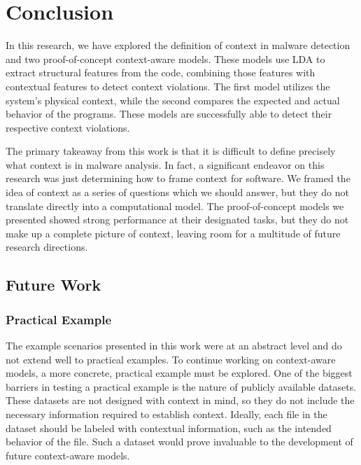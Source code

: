 \documentclass[../stegner_thesis.tex]{subfiles}
\begin{document}
\chapter{Conclusion}%
\label{ch:conclusion}

\par In this research, we have explored the definition of context in malware
detection and two proof-of-concept context-aware models.
These models use LDA to extract structural features from the code, combining
those features with contextual features to detect context violations.
The first model utilizes the system's physical context, while the second
compares the expected and actual behavior of the programs.
These models are successfully able to detect their respective context
violations.

\par The primary takeaway from this work is that it is difficult to define
precisely what context is in malware analysis.
In fact, a significant endeavor on this research was just determining how to
frame context for software.
We framed the idea of context as a series of questions which we should answer,
but they do not translate directly into a computational model.
The proof-of-concept models we presented showed strong performance at their
designated tasks, but they do not make up a complete picture of context,
leaving room for a multitude of future research directions.

\section{Future Work}%
\label{sec:concl_future}

\subsection{Practical Example}%
\label{sec:concl_practical_example}

\par The example scenarios presented in this work were at an abstract level and
do not extend well to practical examples.
To continue working on context-aware models, a more concrete, practical example
must be explored.
One of the biggest barriers in testing a practical example is the nature of
publicly available datasets.
These datasets are not designed with context in mind, so they do not include
the necessary information required to establish context.
Ideally, each file in the dataset should be labeled with contextual
information, such as the intended behavior of the file.
Such a dataset would prove invaluable to the development of future
context-aware models.
\end{document}
